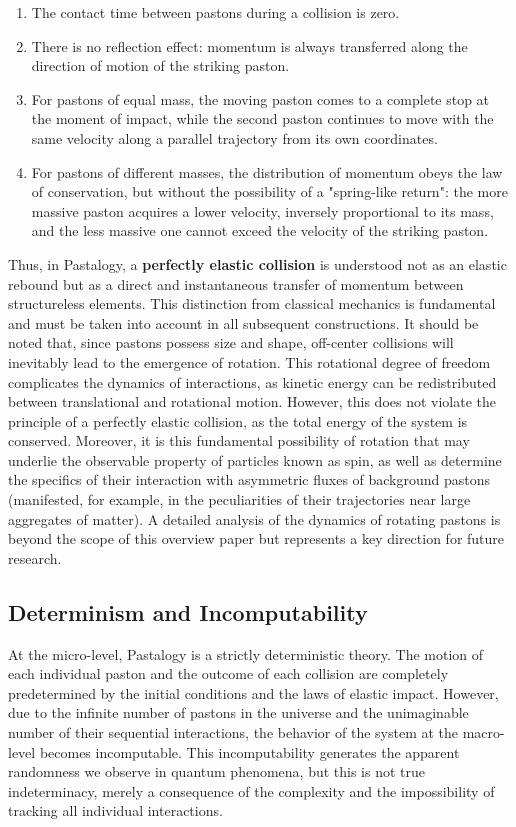\documentclass[pdflatex,sn-mathphys-num]{sn-jnl}
\begin{document}
\begin{enumerate}
  \item The contact time between pastons during a collision is zero.
  \item There is no reflection effect: momentum is always transferred along the direction of motion of the striking paston.
  \item For pastons of equal mass, the moving paston comes to a complete stop at the moment of impact, while the second paston continues to move with the same velocity along a parallel trajectory from its own coordinates.
  \item For pastons of different masses, the distribution of momentum obeys the law of conservation, but without the possibility of a "spring-like return": the more massive paston acquires a lower velocity, inversely proportional to its mass, and the less massive one cannot exceed the velocity of the striking paston.
\end{enumerate}

Thus, in Pastalogy, a \textbf{perfectly elastic collision} is understood not as an elastic rebound but as a direct and instantaneous transfer of momentum between structureless elements. This distinction from classical mechanics is fundamental and must be taken into account in all subsequent constructions. It should be noted that, since pastons possess size and shape, off-center collisions will inevitably lead to the emergence of rotation. This rotational degree of freedom complicates the dynamics of interactions, as kinetic energy can be redistributed between translational and rotational motion. However, this does not violate the principle of a perfectly elastic collision, as the total energy of the system is conserved. Moreover, it is this fundamental possibility of rotation that may underlie the observable property of particles known as spin, as well as determine the specifics of their interaction with asymmetric fluxes of background pastons (manifested, for example, in the peculiarities of their trajectories near large aggregates of matter). A detailed analysis of the dynamics of rotating pastons is beyond the scope of this overview paper but represents a key direction for future research.

\subsection{Determinism and Incomputability}\label{subsec:determinism}

At the micro-level, Pastalogy is a strictly deterministic theory. The motion of each individual paston and the outcome of each collision are completely predetermined by the initial conditions and the laws of elastic impact. However, due to the infinite number of pastons in the universe and the unimaginable number of their sequential interactions, the behavior of the system at the macro-level becomes incomputable. This incomputability generates the apparent randomness we observe in quantum phenomena, but this is not true indeterminacy, merely a consequence of the complexity and the impossibility of tracking all individual interactions.
\end{document}
